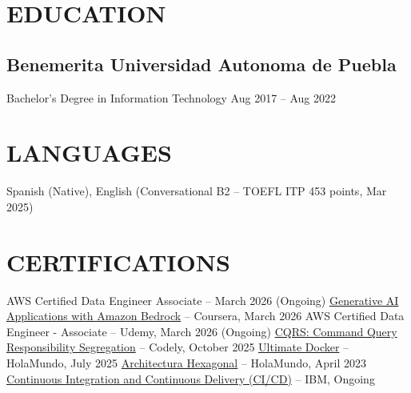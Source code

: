 \documentclass[a4paper,10pt]{article}
\begin{document}
\section*{EDUCATION}

\subsection*{\small Benemerita Universidad Autonoma de Puebla}
Bachelor's Degree in Information Technology \hfill Aug 2017 -- Aug 2022

\section*{LANGUAGES}
Spanish (Native), English (Conversational B2 -- TOEFL ITP 453 points, Mar 2025)

\section*{CERTIFICATIONS}
    AWS Certified Data Engineer Associate -- March 2026 (Ongoing)
    \href{https://coursera.org/verify/HEG7YFDO6D1C}{Generative AI Applications with Amazon Bedrock} -- Coursera, March 2026
    AWS Certified Data Engineer - Associate -- Udemy, March 2026 (Ongoing)
    \href{https://www.linkedin.com/in/jose-carlos-huerta-garcia-773952212/details/certifications}{CQRS: Command Query Responsibility Segregation} -- Codely, October 2025
    \href{https://academia.holamundo.io/certificates/fifvbfywmp}{Ultimate Docker} -- HolaMundo, July 2025
    \href{https://www.linkedin.com/in/jose-carlos-huerta-garcia-773952212/details/certifications/1758852008410/single-media-viewer/?profileId=ACoAADXjsscBqtjtdk4S_qpdkHwZs, Fn9y9TiG0o}{Architectura Hexagonal} -- HolaMundo, April 2023
    \href{https://www.coursera.org/programs/knu-high-o3k80/learn/continuous-integration-and-continuous-delivery-ci-cd?source=search}{Continuous Integration and Continuous Delivery (CI/CD)} -- IBM, Ongoing
\end{document}
